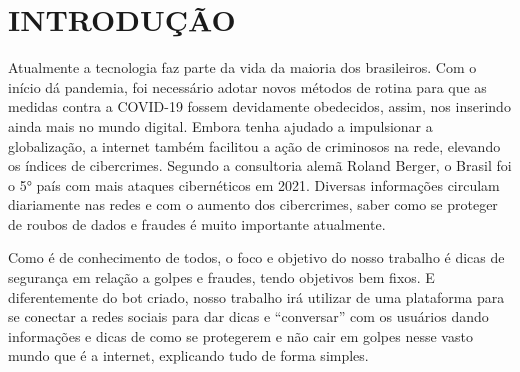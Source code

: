 \chapter{\uppercase{Introdução}}
\label{introducao}

 Atualmente a tecnologia faz parte da vida da maioria dos brasileiros. Com o início dá pandemia, foi 
necessário adotar novos métodos de rotina para que as medidas contra a COVID-19 fossem devidamente 
obedecidos, assim, nos inserindo ainda mais no mundo digital.
Embora tenha ajudado a impulsionar a globalização, a internet também facilitou a ação de criminosos 
na rede, elevando os índices de cibercrimes. Segundo a consultoria alemã Roland Berger, o Brasil foi 
o 5° país com mais ataques cibernéticos em 2021.
Diversas informações circulam diariamente nas redes e com o aumento dos cibercrimes, saber como 
se proteger de roubos de dados e fraudes é muito importante atualmente.

Como é de conhecimento de todos, o foco e objetivo do nosso trabalho é dicas de segurança em relação a golpes e fraudes, tendo objetivos bem fixos. E diferentemente do bot criado, nosso trabalho irá utilizar de uma plataforma para se conectar a redes sociais para dar dicas e “conversar” com os usuários dando informações e dicas de como se protegerem e não cair em golpes nesse vasto mundo que é a internet, explicando tudo de forma simples.